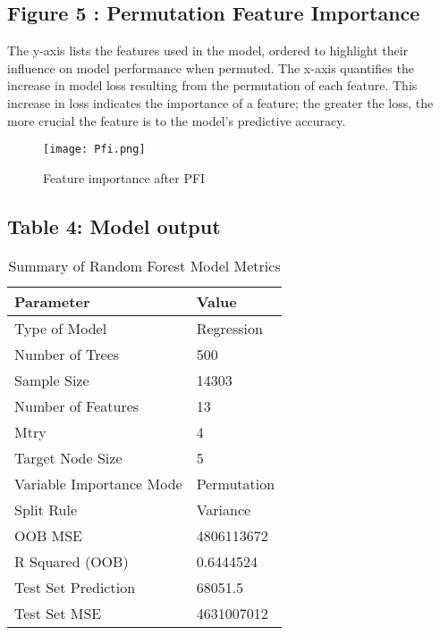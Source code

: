 \documentclass[12pt]{article}
\begin{document}
\subsection{Figure 5 : Permutation Feature Importance}
 The y-axis lists the features used in the model, ordered to highlight their influence on model performance when permuted. The x-axis quantifies the increase in model loss resulting from the permutation of each feature. This increase in loss indicates the importance of a feature; the greater the loss, the more crucial the feature is to the model's predictive accuracy.
\begin{figure}[H]
	\centering
	\texttt{[image: Pfi.png]}
	\caption{Feature importance after PFI}
	\label{fig:pfi}
\end{figure}

\subsection{Table 4: Model output}
\begin{table}[h]
	\centering
	\begin{tabular}{|l|l|}
		\hline
		\textbf{Parameter} & \textbf{Value} \\ \hline
		Type of Model & Regression \\ \hline
		Number of Trees & 500 \\ \hline
		Sample Size & 14303 \\ \hline
		Number of Features & 13 \\ \hline
		Mtry & 4 \\ \hline
		Target Node Size & 5 \\ \hline
		Variable Importance Mode & Permutation \\ \hline
		Split Rule & Variance \\ \hline
		OOB MSE & 4806113672 \\ \hline
		R Squared (OOB) & 0.6444524 \\ \hline
		Test Set Prediction & 68051.5 \\ \hline
		Test Set MSE & 4631007012 \\ \hline
	\end{tabular}
	\caption{Summary of Random Forest Model Metrics}
	\label{tab:model_metrics}
\end{table}

\newpage
\end{document}
